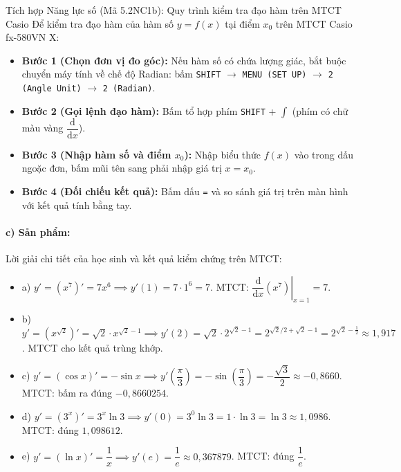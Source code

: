 \documentclass[12pt, a4paper]{article}
\begin{document}
\begin{scaffoldbox}{Tích hợp Năng lực số (Mã 5.2NC1b): Quy trình kiểm tra đạo hàm trên MTCT Casio}
Để kiểm tra đạo hàm của hàm số $y = f(x)$ tại điểm $x_0$ trên MTCT Casio fx-580VN X:
\begin{itemize}[leftmargin=0.5cm]
    \item \textbf{Bước 1 (Chọn đơn vị đo góc):} Nếu hàm số có chứa lượng giác, bắt buộc chuyển máy tính về chế độ Radian: bấm \texttt{SHIFT} $\to$ \texttt{MENU (SET UP)} $\to$ \texttt{2 (Angle Unit)} $\to$ \texttt{2 (Radian)}.
    \item \textbf{Bước 2 (Gọi lệnh đạo hàm):} Bấm tổ hợp phím \texttt{SHIFT} + $\int$ (phím có chữ màu vàng $\dfrac{\mathrm{d}}{\mathrm{d}x}$).
    \item \textbf{Bước 3 (Nhập hàm số và điểm $x_0$):} Nhập biểu thức $f(x)$ vào trong dấu ngoặc đơn, bấm mũi tên sang phải nhập giá trị $x = x_0$.
    \item \textbf{Bước 4 (Đối chiếu kết quả):} Bấm dấu \texttt{=} và so sánh giá trị trên màn hình với kết quả tính bằng tay.
\end{itemize}
\end{scaffoldbox}

\paragraph{c) Sản phẩm:} Lời giải chi tiết của học sinh và kết quả kiểm chứng trên MTCT:
\begin{itemize}[leftmargin=0.8cm]
    \item a) $y' = (x^7)' = 7x^6 \implies y'(1) = 7 \cdot 1^6 = 7$. MTCT: $\left. \dfrac{\mathrm{d}}{\mathrm{d}x} (x^7) \right|_{x=1} = 7$.
    \item b) $y' = (x^{\sqrt{2}})' = \sqrt{2} \cdot x^{\sqrt{2} - 1} \implies y'(2) = \sqrt{2} \cdot 2^{\sqrt{2} - 1} = 2^{\sqrt{2}/2 + \sqrt{2} - 1} = 2^{\sqrt{2} - \frac{1}{2}} \approx 1{,}917$. MTCT cho kết quả trùng khớp.
    \item c) $y' = (\cos x)' = -\sin x \implies y'\left(\dfrac{\pi}{3}\right) = -\sin\left(\dfrac{\pi}{3}\right) = -\dfrac{\sqrt{3}}{2} \approx -0{,}8660$. MTCT: bấm ra đúng $-0{,}8660254$.
    \item d) $y' = (3^x)' = 3^x \ln 3 \implies y'(0) = 3^0 \ln 3 = 1 \cdot \ln 3 = \ln 3 \approx 1{,}0986$. MTCT: đúng $1{,}098612$.
    \item e) $y' = (\ln x)' = \dfrac{1}{x} \implies y'(e) = \dfrac{1}{e} \approx 0{,}367879$. MTCT: đúng $\dfrac{1}{e}$.
\end{itemize}
\end{document}
